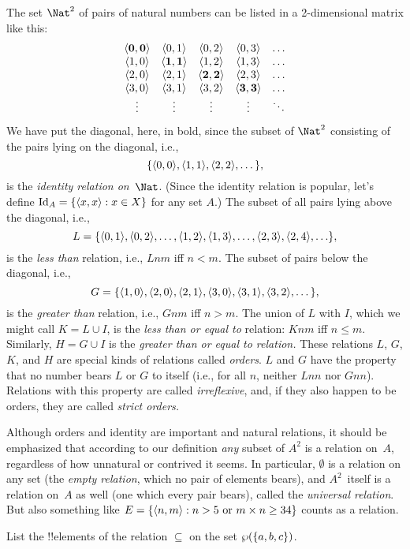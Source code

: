 \documentclass[../../../include/open-logic-section]{subfiles}
\begin{document}
\begin{ex}
The set $\Nat^{2}$ of pairs of natural numbers can be listed in a
2-dimensional matrix like this:
\[
  \begin{array}{ccccc}
  \mathbf{\tuple{ 0,0 }} & \tuple{ 0,1 } &
    \tuple{ 0,2 } & \tuple{ 0,3 } & \ldots\\
  \tuple{ 1,0 } & \mathbf{\tuple{ 1,1 }} &
    \tuple{ 1,2 } & \tuple{ 1,3 } & \ldots\\
  \tuple{ 2,0 } & \tuple{ 2,1 } &
    \mathbf{\tuple{ 2,2 }} & \tuple{ 2,3 } & \ldots\\
  \tuple{ 3,0 } & \tuple{ 3,1 } & \tuple{ 3,2 } &
    \mathbf{\tuple{ 3,3 }} & \ldots\\
  \vdots & \vdots & \vdots & \vdots & \mathbf{\ddots}
  \end{array}
\]
We have put the diagonal, here, in bold, since the subset of $\Nat^2$
consisting of the pairs lying on the diagonal, i.e.,
\[
  \{\langle 0,0  \rangle, \langle  1,1  \rangle, \langle  2,2  \rangle, \dots\},
  \]
is the \emph{identity relation on}~$\Nat$. (Since the identity
relation is popular, let's define $\mathord{\mathrm{Id}_{A}}=\{ \langle  x,x  \rangle : x \in
X \}$ for any set $A$.) The subset of all pairs lying above the
diagonal, i.e.,
\[
  L = \{\langle  0,1  \rangle,\langle  0,2  \rangle,\ldots,\langle  1,2  \rangle,
  \langle  1,3  \rangle, \dots, \langle  2,3  \rangle, \langle  2,4  \rangle,\ldots\},
\]
is the \emph{less than} relation, i.e., $Lnm$ iff $n<m$. The subset of
pairs below the diagonal, i.e.,
\[
  G=\{ \langle  1,0  \rangle,\langle  2,0  \rangle,\langle 
    2,1  \rangle, \langle  3,0  \rangle,\langle  3,1  \rangle,\langle  3,2  \rangle, \dots\},
\]
is the \emph{greater than} relation, i.e., $Gnm$ iff $n>m$. The union
of $L$ with $I$, which we might call $K=L\cup I$, is the \emph{less
than or equal to} relation: $Knm$ iff $n \le m$. Similarly, $H=G \cup
I$ is the \emph{greater than or equal to relation.} These relations
$L$, $G$, $K$, and $H$ are special kinds of relations called
\emph{orders}. $L$ and $G$ have the property that no number bears $L$
or $G$ to itself (i.e., for all $n$, neither $Lnn$ nor $Gnn$).
Relations with this property are called \emph{irreflexive}, and, if
they also happen to be orders, they are called \emph{strict orders.}
\end{ex}

\begin{explain}
Although orders and identity are important and natural relations, it
should be emphasized that according to our definition \emph{any}
subset of $A^{2}$ is a relation on~$A$, regardless of how unnatural or
contrived it seems. In particular, $\emptyset$ is a relation on any
set (the \emph{empty relation}, which no pair of elements bears), and
$A^{2}$~itself is a relation on~$A$ as well (one which every pair
bears), called the \emph{universal relation}. But also something like
$E=\{ \langle n, m \rangle : n>5 \text{ or } m \times n \ge 34 \}$ counts as
a relation.
\end{explain}
  
\begin{prob}
  List the !!{element}s of the relation $\subseteq$ on the set
  $\wp(\{a, b, c\})$.
\end{prob}
\end{document}
